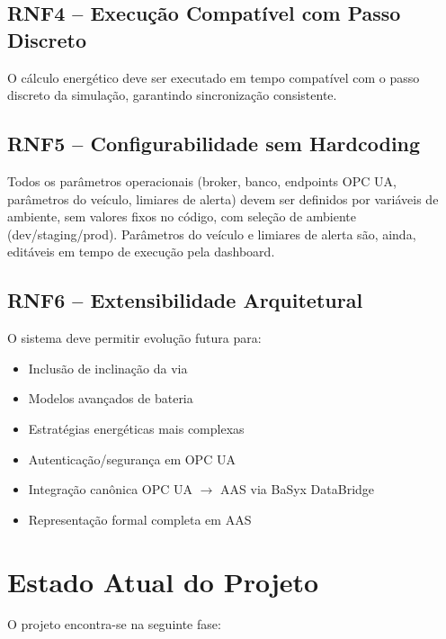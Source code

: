 \documentclass[12pt,a4paper]{report}
\begin{document}
\subsection*{RNF4 -- Execução Compatível com Passo Discreto}
O cálculo energético deve ser executado em tempo compatível com o passo discreto da simulação, garantindo sincronização consistente.

\subsection*{RNF5 -- Configurabilidade sem Hardcoding}
Todos os parâmetros operacionais (broker, banco, endpoints OPC UA, parâmetros do veículo, limiares de alerta) devem ser definidos por variáveis de ambiente, sem valores fixos no código, com seleção de ambiente (dev/staging/prod). Parâmetros do veículo e limiares de alerta são, ainda, editáveis em tempo de execução pela dashboard.

\subsection*{RNF6 -- Extensibilidade Arquitetural}
O sistema deve permitir evolução futura para:
\begin{itemize}
\item Inclusão de inclinação da via
\item Modelos avançados de bateria
\item Estratégias energéticas mais complexas
\item Autenticação/segurança em OPC UA
\item Integração canônica OPC UA $\rightarrow$ AAS via BaSyx DataBridge
\item Representação formal completa em AAS
\end{itemize}

\section{Estado Atual do Projeto}

O projeto encontra-se na seguinte fase:
\end{document}

